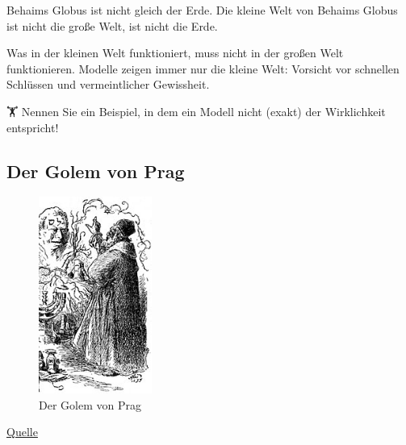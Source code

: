 \documentclass[
  a4paper,
  DIV=11]{scrreprt}
\theoremstyle{definition}
\theoremstyle{remark}
\begin{document}
\begin{tcolorbox}[enhanced jigsaw, colframe=quarto-callout-note-color-frame, title=\textcolor{quarto-callout-note-color}{\faInfo}\hspace{0.5em}{Hinweis}, breakable, leftrule=.75mm, coltitle=black, toptitle=1mm, bottomrule=.15mm, bottomtitle=1mm, opacityback=0, arc=.35mm, rightrule=.15mm, left=2mm, colbacktitle=quarto-callout-note-color!10!white, opacitybacktitle=0.6, toprule=.15mm, titlerule=0mm, colback=white]
Behaims Globus ist nicht gleich der Erde. Die kleine Welt von Behaims
Globus ist nicht die große Welt, ist nicht die Erde.
\end{tcolorbox}

Was in der kleinen Welt funktioniert, muss nicht in der großen Welt
funktionieren. Modelle zeigen immer nur die kleine Welt: Vorsicht vor
schnellen Schlüssen und vermeintlicher Gewissheit.

🏋 Nennen Sie ein Beispiel, in dem ein Modell nicht (exakt) der
Wirklichkeit entspricht!

\hypertarget{der-golem-von-prag}{%
\subsection{Der Golem von Prag}\label{der-golem-von-prag}}

\begin{figure}

{\centering \includegraphics[width=0.33\textwidth,height=\textheight]{./img/170px-Golem_and_Loew.jpg}

}

\caption{\label{fig-golem-prag}Der Golem von Prag}

\end{figure}

\href{https://de.wikipedia.org/wiki/Golem}{Quelle}
\end{document}
